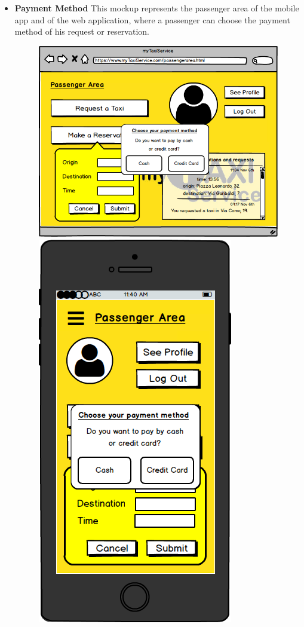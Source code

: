 \documentclass[18pt,oneside,a4paper, titlepage]{article}
\begin{document}
\begin{itemize}
\begin{figure}[h]
				\end{figure}
				\\ \\ \\
				\item \textbf{Payment Method} This mockup represents the passenger area of the mobile app and of the web application, where a passenger can choose the payment method of his request or reservation.\\
				\begin{figure}[h]
					\includegraphics[scale=0.3]{WebAppPaymentMethod.png}%
					\qquad\qquad
					\includegraphics[scale=0.3]{MobileAppPaymentMethod.png}

\end{figure}
\end{itemize}
\end{document}
